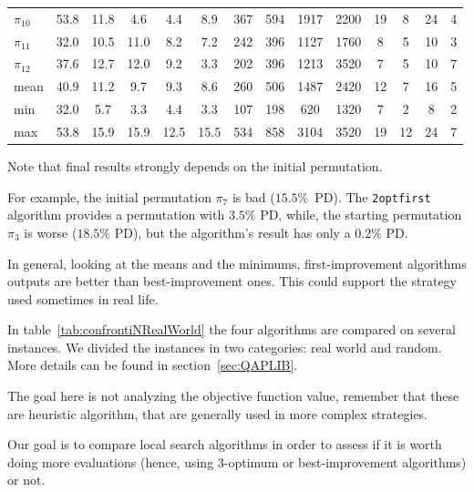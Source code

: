 \begin{table}
\begin{tabular}{lS[table-format =2.1]*{4}{S[table-format =1.1]}*{4}{S[table-format =4]}*{4}{S[table-format =2.0]} }
	$\pi_{10}$&        53.8 &11.8 & 4.6 & 4.4 & 8.9 &   367 &   594 &  1917 &  2200 &    19 &     8 &    24 &     4\\
	$\pi_{11}$&        32.0 &10.5 &11.0 & 8.2 & 7.2 &   242 &   396 &  1127 &  1760 &     8 &     5 &    10 &     3\\
	$\pi_{12}$&        37.6 &12.7 &12.0 & 9.2 & 3.3 &   202 &   396 &  1213 &  3520 &     7 &     5 &    10 &     7\\
\midrule
	mean&  40.9& 11.2 & 9.7 & 9.3 & 8.6 &   260 &   506 &  1487 &  2420 &    12 &     7 &    16 &     5\\
	min&  32.0&  5.7 & 3.3 & 4.4 & 3.3 &     107 &     198 &     620 &    1320 &       7 &       2 &       8 &       2\\
	max&  53.8& 15.9 &15.9 &12.5 &15.5 &     534 &     858 &    3104 &    3520 &      19 &      12 &      24 &       7\\
	\bottomrule
	\end{tabular}
\end{table}





Note that final results strongly depends on the initial permutation. 

	For example, the initial permutation $\pi_7$ is bad ($\num{15.5}\%$~PD). The \texttt{2optfirst} algorithm provides a permutation with $\num{3.5}\%$ PD, while, the starting permutation $\pi_3$ is worse ($\num{18.5}\%$ PD), but the algorithm's result has only a $\num{0.2}\%$  PD.



In general, looking at the means and the minimums, first-improvement algorithms outputs are better than best-improvement ones. This  could support the strategy  used sometimes in real life. 





	In table~\ref{tab:confrontiNRealWorld} the four algorithms are compared on several instances. We divided the instances in two categories: real world and random. More details can be found in section~\ref{sec:QAPLIB}.


The goal here is not analyzing the objective function value, remember that these are heuristic algorithm, that are generally used in more complex strategies. 

Our goal is to compare local search algorithms in order to assess if it is worth doing more evaluations (hence, using $3$-optimum or best-improvement algorithms) or not.

